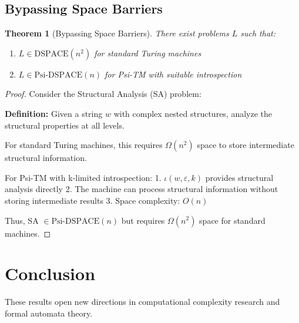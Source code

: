\documentclass[11pt]{article}
\newtheorem{theorem}{Theorem}
\begin{document}
\subsection{Bypassing Space Barriers}

\begin{theorem}[Bypassing Space Barriers]
There exist problems $L$ such that:
\begin{enumerate}
\item $L \in \text{DSPACE}(n^2)$ for standard Turing machines
\item $L \in \text{Psi-DSPACE}(n)$ for Psi-TM with suitable introspection
\end{enumerate}
\end{theorem}

\begin{proof}
Consider the Structural Analysis (SA) problem:

\textbf{Definition:} Given a string $w$ with complex nested structures, analyze the structural properties at all levels.

For standard Turing machines, this requires $\Omega(n^2)$ space to store intermediate structural information.

For Psi-TM with k-limited introspection:
1. $\iota(w, \varepsilon, k)$ provides structural analysis directly
2. The machine can process structural information without storing intermediate results
3. Space complexity: $O(n)$

Thus, SA $\in \text{Psi-DSPACE}(n)$ but requires $\Omega(n^2)$ space for standard machines.
\end{proof}

\section{Conclusion}

These results open new directions in computational complexity research and formal automata theory.
\end{document}
